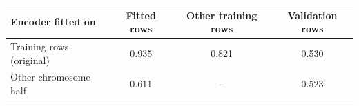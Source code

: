 \begin{tabular}{lccc}
\toprule
Encoder fitted on & Fitted rows & Other training rows & Validation rows \\
\midrule
Training rows (original) & 0.935 & 0.821 & 0.530 \\
Other chromosome half & 0.611 & -- & 0.523 \\
\bottomrule
\end{tabular}
